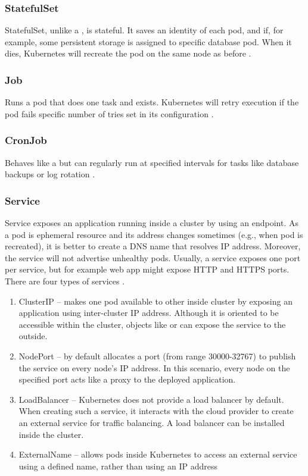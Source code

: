 \subsubsection{StatefulSet}
\label{statefulset}

StatefulSet, unlike a \textit{}, is stateful. It saves an identity of each pod, and if, for example, some persistent storage is assigned to specific database pod. When it dies, Kubernetes will recreate the pod on the same node as before \cite{KubernetesDocs}.

\subsubsection{Job}
\label{job}

Runs a pod that does one task and exists. Kubernetes will retry execution if the pod fails specific number of tries set in its configuration \cite{KubernetesDocs}.

\subsubsection{CronJob}
\label{cronjob}
Behaves like a \textit{} but can regularly run at specified intervals for tasks like database backups or log rotation \cite{KubernetesDocs}. 

\subsubsection{Service}
\label{svc}

Service exposes an application running inside a cluster by using an endpoint. As a pod is ephemeral resource and its address changes sometimes (e.g., when pod is recreated), it is better to create a DNS name that resolves IP address. Moreover, the service will not advertise unhealthy pods. Usually, a service exposes one port per service, but for example web app might expose HTTP and HTTPS ports. There are four types of services \cite{KubernetesDocs}. 


\begin{enumerate}
    \item ClusterIP -- makes one pod available to other inside cluster by exposing an application using inter-cluster IP address. Although it is oriented to be accessible within the cluster, objects like \textit{} or \textit{} can expose the service to the outside.
    \item NodePort -- by default allocates a port (from range 30000-32767) to publish the service on every node's IP address. In this scenario, every node on the specified port acts like a proxy to the deployed application.
    \item LoadBalancer -- Kubernetes does not provide a load balancer by default. When creating such a service, it interacts with the cloud provider to create an external service for traffic balancing. A load balancer can be installed inside the cluster.
    \item ExternalName -- allows pods inside Kubernetes to access an external service using a defined name, rather than using an IP address 
\end{enumerate}


